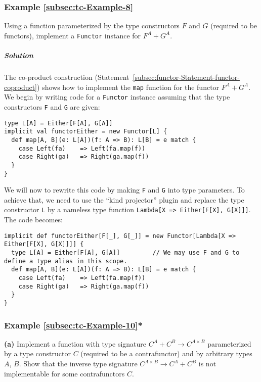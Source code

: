 \subsubsection{Example \label{subsec:tc-Example-8}\ref{subsec:tc-Example-8}}

Using a function parameterized by the type constructors $F$ and $G$
(required to be functors), implement a \lstinline!Functor! instance
for $F^{A}+G^{A}$.

\subparagraph{Solution}

The co-product construction (Statement~\ref{subsec:functor-Statement-functor-coproduct})
shows how to implement the \lstinline!map! function for the functor
$F^{A}+G^{A}$. We begin by writing code for a \lstinline!Functor!
instance assuming that the type constructors \lstinline!F! and \lstinline!G!
are given:
\begin{lstlisting}
type L[A] = Either[F[A], G[A]]
implicit val functorEither = new Functor[L] {
  def map[A, B](e: L[A])(f: A => B): L[B] = e match {
    case Left(fa)    => Left(fa.map(f))
    case Right(ga)   => Right(ga.map(f))
  }
}
\end{lstlisting}
We will now to rewrite this code by making \lstinline!F! and \lstinline!G!
into type parameters. To achieve that, we need to use the \textsf{``}kind
projector\textsf{''} plugin and replace
the type constructor \lstinline!L! by a nameless type function \lstinline!Lambda[X => Either[F[X], G[X]]]!.
The code becomes:
\begin{lstlisting}
implicit def functorEither[F[_], G[_]] = new Functor[Lambda[X => Either[F[X], G[X]]]] {
  type L[A] = Either[F[A], G[A]]         // We may use F and G to define a type alias in this scope.
  def map[A, B](e: L[A])(f: A => B): L[B] = e match {
    case Left(fa)    => Left(fa.map(f))
    case Right(ga)   => Right(ga.map(f))
  }
}
\end{lstlisting}


\subsubsection{Example \label{subsec:tc-Example-10}\ref{subsec:tc-Example-10}{*}}

\textbf{(a)} Implement a function with type signature $C^{A}+C^{B}\rightarrow C^{A\times B}$
parameterized by a type constructor $C$ (required to be a contrafunctor)
and by arbitrary types $A$, $B$. Show that the inverse type signature
$C^{A\times B}\rightarrow C^{A}+C^{B}$ is not implementable for some
contrafunctors $C$.

